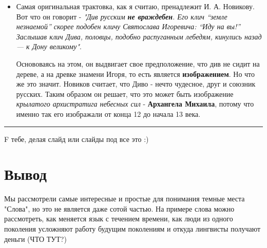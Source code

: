\documentclass[14pt, a4paper]{article}
\newcommand{\descr}[1]
  {\par\noindent\rule{0.5\textwidth}{0.4pt} \par {\large #1}}
\begin{document}
{\begin{itemize}
  \item Самая оригинальная трактовка, как я считаю, пренадлежит И. А. Новикову. Вот что он говорит - {\itshape "Див русским {\bfseries не враждебен}. Его клич “земле незнаемой” скорее подобен кличу Святослава Игоре­вича: “Иду на вы!” Заслышав клич Дива, половцы, подобно распуганным лебедям, кинулись назад — к Дону великому"}. 
    \par Основоваясь на этом, он выдвигает свое предположение, что див не сидит на дереве, а на древке знамени Игоря, то есть является {\bfseries изображением}. Но что же это значит. Новиков считает, что Диво - нечто чудесное, друг и союзник русских. Таким образом он решает, что это может быть изображение {\itshape крылатого архистратига небесных сил} - {\bfseries Архангела Михаила}, потому что именно так его изображали от конца 12 до начала 13 века.
\end{itemize}
\descr{F тебе, делая слайд или слайды под все это :)}

\section{Вывод}
Мы рассмотрели самые интересные и простые для понимания темные места "Слова", но это не является даже сотой частью. На примере слова можно рассмотреть, как меняется язык с течением времени, как люди из одного поколения усложняют работу будущим поколениям и откуда лингвисты получают деньги (ЧТО ТУТ?)



}
\end{document}
